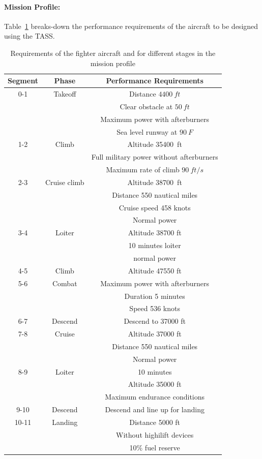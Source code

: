 \documentclass[pdftex,11pt,letter]{article}
\begin{document}
\paragraph{Mission Profile:}
Table~\ref{tab:requirements} breaks-down the performance requirements of the aircraft to be designed using the TASS. 
\begin{table}[h]
\caption{Requirements of the fighter aircraft and for different stages in the mission profile}
\centering 
\begin{tabular}{c| c| c}
\hline\hline
{Segment} & Phase       & Performance Requirements \\
\hline\hline
0-1 	& Takeoff 	& Distance $4400~ft$ \\
	&		& Clear obstacle at $50~ft$\\
	& 		& Maximum power with afterburners\\
	&		& Sea level runway at $90~F$\\\hline
1-2	& Climb		& Altitude 35400~ft \\
	& 		& Full military power without afterburners\\
	&		& Maximum rate of climb $90~ft/s$\\
\hline
2-3 	& Cruise climb	& Altitude 38700~ft \\
	&		& Distance 550 nautical miles \\
	&		& Cruise speed 458 knots\\
	&		& Normal power \\
\hline
3-4 	& Loiter	& Altitude 38700 ft\\
	&		& 10 minutes loiter \\
	& 		& normal power\\
\hline
4-5	& Climb		& Altitude 47550 ft\\
\hline
5-6	& Combat 	& Maximum power with afterburners \\
	&		& Duration 5 minutes \\
	& 		& Speed 536 knots \\
\hline
6-7	& Descend 	& Descend to 37000 ft\\
\hline
7-8	& Cruise 	& Altitude 37000 ft\\
	& 		& Distance 550 nautical miles\\
	&		& Normal power\\
\hline
8-9	& Loiter	& 10 minutes  \\	
	& 		& Altitude 35000 ft\\
	&		& Maximum endurance conditions \\
\hline
9-10	& Descend 	& Descend and line up for landing\\
\hline
10-11	& Landing	& Distance 5000 ft \\
	&		& Without highilift devices\\	
	&		& 10$\%$ fuel reserve\\
\hline\hline
\end{tabular}
\label{tab:requirements}
\end{table}
\end{document}
